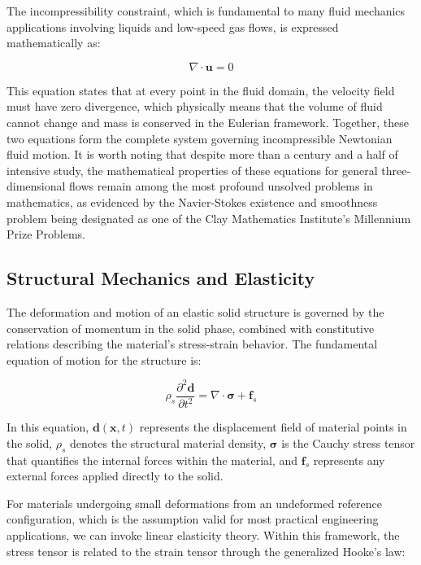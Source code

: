 ﻿\documentclass[a4paper,11pt]{article}
\theoremstyle{definition}
\begin{document}
The incompressibility constraint, which is fundamental to many fluid mechanics applications involving liquids and low-speed gas flows, is expressed mathematically as:

\begin{equation}
\nabla \cdot \mathbf{u} = 0
\label{eq:continuity}
\end{equation}

This equation states that at every point in the fluid domain, the velocity field must have zero divergence, which physically means that the volume of fluid cannot change and mass is conserved in the Eulerian framework. Together, these two equations form the complete system governing incompressible Newtonian fluid motion. It is worth noting that despite more than a century and a half of intensive study, the mathematical properties of these equations for general three-dimensional flows remain among the most profound unsolved problems in mathematics, as evidenced by the Navier-Stokes existence and smoothness problem being designated as one of the Clay Mathematics Institute's Millennium Prize Problems.

\subsection{Structural Mechanics and Elasticity}

The deformation and motion of an elastic solid structure is governed by the conservation of momentum in the solid phase, combined with constitutive relations describing the material's stress-strain behavior. The fundamental equation of motion for the structure is:

\begin{equation}
\rho_s \frac{\partial^2 \mathbf{d}}{\partial t^2} = \nabla \cdot \boldsymbol{\sigma} + \mathbf{f}_s
\label{eq:structural_motion}
\end{equation}

In this equation, $\mathbf{d}(\mathbf{x},t)$ represents the displacement field of material points in the solid, $\rho_s$ denotes the structural material density, $\boldsymbol{\sigma}$ is the Cauchy stress tensor that quantifies the internal forces within the material, and $\mathbf{f}_s$ represents any external forces applied directly to the solid.

For materials undergoing small deformations from an undeformed reference configuration, which is the assumption valid for most practical engineering applications, we can invoke linear elasticity theory. Within this framework, the stress tensor is related to the strain tensor through the generalized Hooke's law:
\end{document}
